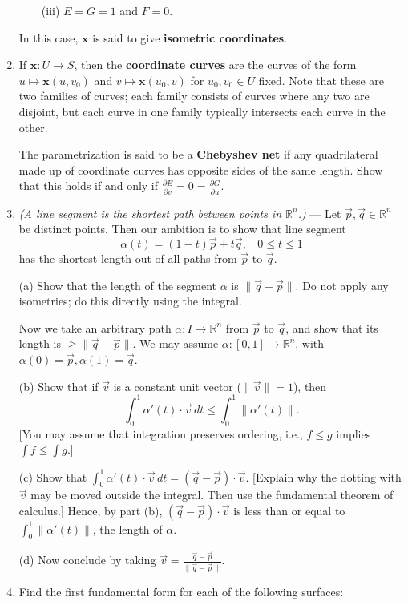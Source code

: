 \documentclass[leqno]{book}
\begin{document}
\begin{enumerate}
~~~~(iii) $E=G=1$ and $F=0$.

In this case, $\mathbf x$ is said to give \textbf{isometric coordinates}.

\item If $\mathbf x:U\to S$, then the \textbf{coordinate curves} are the curves of the form $u\mapsto\mathbf x(u,v_0)$ and $v\mapsto\mathbf x(u_0,v)$ for $u_0,v_0\in U$ fixed.  Note that these are two families of curves; each family consists of curves where any two are disjoint, but each curve in one family typically intersects each curve in the other.

The parametrization is said to be a \textbf{Chebyshev net} if any quadrilateral made up of coordinate curves has opposite sides of the same length.  Show that this holds if and only if $\frac{\partial E}{\partial v}=0=\frac{\partial G}{\partial u}$.

\item\emph{(A line segment is the shortest path between points in $\mathbb R^n$.)} \---- Let $\vec p,\vec q\in\mathbb R^n$ be distinct points.  Then our ambition is to show that line segment
$$\alpha(t)=(1-t)\vec p+t\vec q,~~~~0\leqslant t\leqslant 1$$
has the shortest length out of all paths from $\vec p$ to $\vec q$.

(a) Show that the length of the segment $\alpha$ is $\|\vec q-\vec p\|$.  Do not apply any isometries; do this directly using the integral.

Now we take an arbitrary path $\alpha:I\to\mathbb R^n$ from $\vec p$ to $\vec q$, and show that its length is $\geqslant\|\vec q-\vec p\|$.  We may assume $\alpha:[0,1]\to\mathbb R^n$, with $\alpha(0)=\vec p,\alpha(1)=\vec q$.

(b) Show that if $\vec v$ is a constant unit vector ($\|\vec v\|=1$), then
$$\int_0^1\alpha'(t)\cdot\vec v\,dt\leqslant\int_0^1\|\alpha'(t)\|.$$
[You may assume that integration preserves ordering, i.e., $f\leqslant g$ implies $\int f\leqslant\int g$.]

(c) Show that $\int_0^1\alpha'(t)\cdot\vec v\,dt=(\vec q-\vec p)\cdot\vec v$.  [Explain why the dotting with $\vec v$ may be moved outside the integral.  Then use the fundamental theorem of calculus.]  Hence, by part (b), $(\vec q-\vec p)\cdot\vec v$ is less than or equal to $\int_0^1\|\alpha'(t)\|$, the length of $\alpha$.

(d) Now conclude by taking $\vec v=\frac{\vec q-\vec p}{\|\vec q-\vec p\|}$.

\item Find the first fundamental form for each of the following surfaces: %


\end{enumerate}
\end{document}
